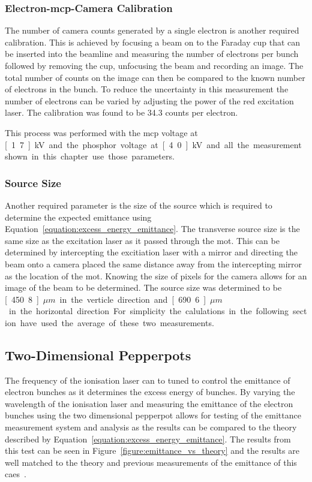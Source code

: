 \subsubsection{Electron-\gls{mcp}-Camera Calibration}
The number of camera counts generated by a single electron is another required calibration.
This is achieved by focusing a beam on to the Faraday cup that can be inserted into the beamline and measuring the number of electrons per bunch followed by removing the cup, unfocusing the beam and recording an image.
The total number of counts on the image can then be compared to the known number of electrons in the bunch.
To reduce the uncertainty in this measurement the number of electrons can be varied by adjusting the power of the red excitation laser.
The calibration was found to be 34.3 counts per electron.

This process was performed with the \gls{mcp} voltage at \unit[1.7]{kV} and the phosphor voltage at \unit[4.0]{kV} and all the measurement shown in this chapter use those parameters.

\subsubsection{Source Size}
Another required parameter is the size of the source which is required to determine the expected emittance using Equation~\ref{equation:excess_energy_emittance}.
The transverse source size is the same size as the excitation laser as it passed through the \gls{mot}.
This can be determined by intercepting the excitiation laser with a mirror and directing the beam onto a camera placed the same distance away from the intercepting mirror as the location of the \gls{mot}.
Knowing the size of pixels for the camera allows for an image of the beam to be determined.
The source size was determined to be \unit[450.8]{$\mu m$} in the verticle direction and \unit[690.6]{$\mu m$} in the horizontal direction.
For simplicity the calulations in the following section have used the average of these two measurements.

\subsection{Two-Dimensional Pepperpots}
The frequency of the ionisation laser can to tuned to control the emittance of electron bunches as it determines the excess energy of bunches.
By varying the wavelength of the ionisation laser and measuring the emittance of the electron bunches using the two dimensional pepperpot allows for testing of the emittance measurement system and analysis as the results can be compared to the theory described by Equation~\ref{equation:excess_energy_emittance}.
The results from this test can be seen in Figure~\ref{figure:emittance_vs_theory} and the results are well matched to the theory and previous measurements of the emittance of this \gls{caes}~\cite{mcculloch_high-coherence_2013}.

